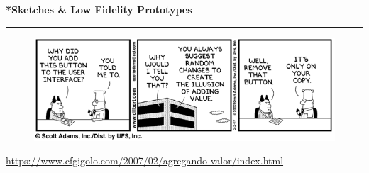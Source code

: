 \documentclass[pdf]{beamer}
\begin{document}
\begin{frame}
\vspace{8mm}
\textcolor{myBlue}{\textbf{\Large{*Sketches \& Low Fidelity Prototypes}}}

\textcolor{red}{\rule{10cm}{1mm}}

\begin{figure}[b]
    \includegraphics[scale = 0.8]{value_added_illusions.png}
\end{figure}

\url{https://www.cfgigolo.com/2007/02/agregando-valor/index.html}

\end{frame}
\end{document}
